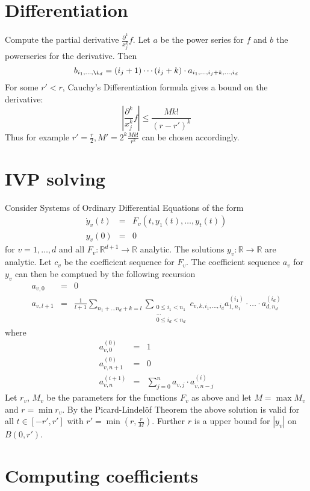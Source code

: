 \documentclass[]{article}
\newcommand{\RR}{\mathbb R}
\newcommand{\abs}[1]{\left|#1\right|}
\begin{document}
\section{Differentiation}
Compute the partial derivative $\frac{\partial^k}{x_j^k}f$.
Let $a$ be the power series for $f$ and $b$ the powerseries for the derivative.
Then
$$ b_{i_1,\dots, \i_d} = (i_j+1) \cdots (i_j+k) \cdot a_{i_1, \dots, i_j+k, \dots, i_d} $$
For some $r' < r$, Cauchy's Differentiation formula gives a bound on the derivative:
$$\abs{\frac{\partial^k}{x_j^k}f} \leq \frac{Mk!}{(r-r')^k}$$
Thus for example $r'=\frac{r}{2}, M'=2^k\frac{Mk!}{r^k}$ can be chosen accordingly.
\section{IVP solving}
Consider Systems of Ordinary Differential Equations of the form
\begin{eqnarray*}
  \dot y_v(t) &=& F_v(t, y_1(t), \dots, y_t(t)) \\
  y_v(0) &=& 0 
\end{eqnarray*}
for $v=1,\dots,d$ and all $F_v : \RR^{d+1} \to \RR$ analytic.
The solutions $y_v : \RR \to \RR$ are analytic.
Let $c_v$ be the coefficient sequence for $F_v$.
The coefficient sequence $a_v$ for $y_v$ can then be comptued by the following recursion
\begin{eqnarray*}
  a_{v,0} &=& 0 \\
  a_{v, l+1} &=& \frac{1}{l+1} \sum_{n_1+\dots n_d + k = l} \sum_{\substack {0 \leq i_1 < n_1 \\ \dots\\ 0 \leq i_d < n_d}} c_{v,k,i_1,\dots,i_d} a_{1,n_1}^{(i_1)}\cdot \dots \cdot a_{d, n_d}^{(i_d)}
\end{eqnarray*}
where
\begin{eqnarray*}
 a^{(0)}_{v,0} & = & 1 \\
 a^{(0)}_{v,n+1} & = & 0 \\
 a^{(i+1)}_{v,n} & = & \sum_{j=0}^n a_{v,j} \cdot a_{v, n-j}^{(i)}
\end{eqnarray*}
Let $r_v$, $M_v$ be the parameters for the functions $F_v$ as above and let $M = \max M_v$ and $r = \min r_v$.
By the Picard-Lindel\"{o}f Theorem the above solution is valid for all $t \in [-r', r']$ with $r' = \min(r, \frac{r}{M})$.
Further $r$ is a upper bound for $\abs{y_v}$ on $B(0, r')$. 
\section{Computing coefficients}
\end{document}
